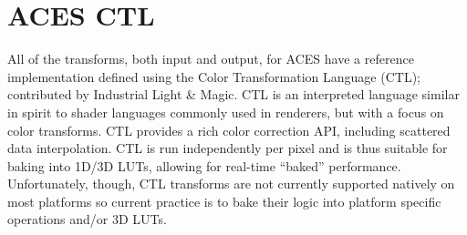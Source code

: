 \section{ACES CTL}%
\label{sec:aces-ctl}

All of the transforms, both input and output, for ACES have a reference implementation defined using the Color Transformation Language (CTL); contributed by Industrial Light & Magic. CTL is an interpreted language similar in spirit to shader languages commonly used in renderers, but with a focus on color transforms. CTL provides a rich color correction API, including scattered data interpolation. CTL is run independently per pixel and is thus suitable for baking into 1D/3D LUTs, allowing for real-time “baked” performance. Unfortunately, though, CTL transforms are not currently supported natively on most platforms so current practice is to bake their logic into platform specific operations and/or 3D LUTs.

